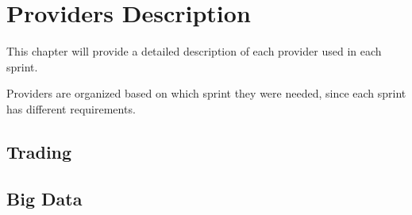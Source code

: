 \chapter{Providers Description} \label{section:providers}
    
    \reword
    This chapter will provide a detailed description of each provider used in each sprint.
    
    Providers are organized based on which sprint they were needed, since each sprint has different requirements.
    
    \section{Trading}
        
        
    \section{Big Data}
        
        
    \restoretocdepth